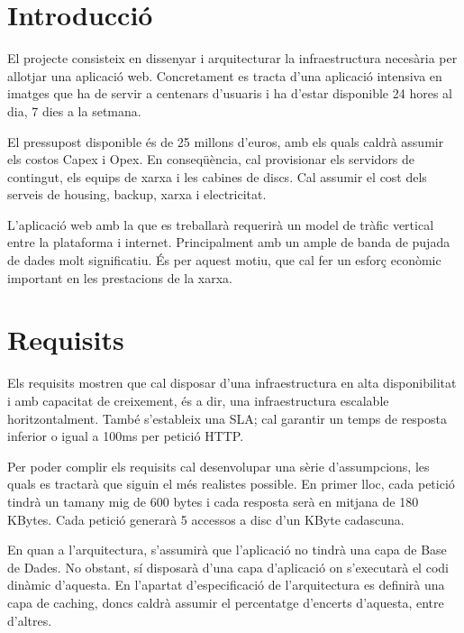 \section{Introducció}
El projecte consisteix en dissenyar i arquitecturar la infraestructura necesària per allotjar una aplicació web. Concretament es tracta d'una aplicació intensiva en imatges que ha de servir a centenars d'usuaris i ha d'estar disponible 24 hores al dia, 7 dies a la setmana.

El pressupost disponible és de 25 millons d'euros, amb els quals caldrà assumir els costos Capex i Opex. En conseqüència, cal provisionar els servidors de contingut, els equips de xarxa i les cabines de discs. Cal assumir el cost dels serveis de housing, backup, xarxa i electricitat. 

L'aplicació web amb la que es treballarà requerirà un model de tràfic vertical entre la plataforma i internet. Principalment amb un ample de banda de pujada de dades molt significatiu. És per aquest motiu, que cal fer un esforç econòmic important en les prestacions de la xarxa.


\section{Requisits}

Els requisits mostren que cal disposar d'una infraestructura en alta disponibilitat i amb capacitat de creixement, és a dir, una infraestructura escalable horitzontalment. També s'estableix una SLA; cal garantir un temps de resposta inferior o igual a 100ms per petició HTTP.

Per poder complir els requisits cal desenvolupar una sèrie d'assumpcions, les quals es tractarà que siguin el més realistes possible. En primer lloc, cada petició tindrà un tamany mig de 600 bytes i cada resposta serà en mitjana de 180 KBytes. Cada petició generarà 5 accessos a disc d'un KByte cadascuna.

En quan a l'arquitectura, s'assumirà que l'aplicació no tindrà una capa de Base de Dades. No obstant, sí disposarà d'una capa d'aplicació on s'executarà el codi dinàmic d'aquesta. En l'apartat d'especificació de l'arquitectura es definirà una capa de caching, doncs caldrà assumir el percentatge d'encerts d'aquesta, entre d'altres.
